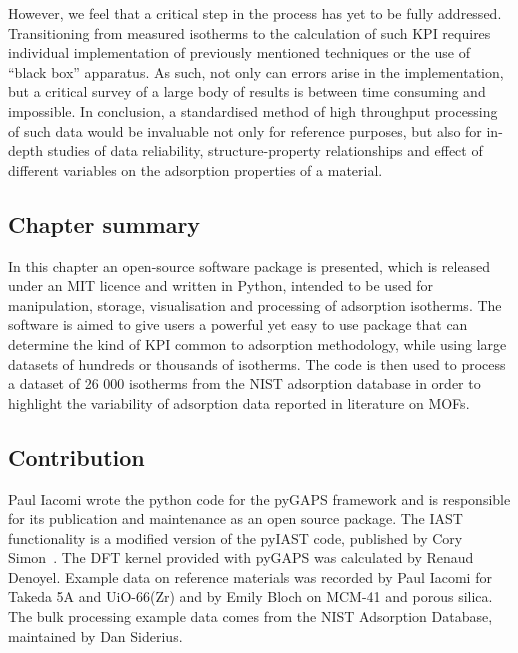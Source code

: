 However, we feel that a critical step in the process has yet
to be fully addressed. Transitioning from measured isotherms
to the calculation of such \gls{KPI} requires individual
implementation of previously mentioned techniques or the use of 
``black box'' apparatus. As such,
not only can errors arise in the implementation, but
a critical survey of a large body of results is between time consuming
and impossible. In conclusion, a standardised method of high throughput
processing of such data would be invaluable not only for reference purposes,
but also for in-depth studies of data reliability,
structure-property relationships and effect of different variables on
the adsorption properties of a material.

\subsection*{Chapter summary}

In this chapter an open-source software package is presented, which
is released under an MIT licence and written in Python, intended to be
used for manipulation, storage, visualisation and processing of
adsorption isotherms. The software is aimed to give users a powerful
yet easy to use package that can determine the kind of \gls{KPI}
common to adsorption methodology, while using large datasets of hundreds
or thousands of isotherms. The code is then used to process a
dataset of 26 000 isotherms from the \gls{NIST} adsorption database in order
to highlight the variability of adsorption data reported in literature
on \glspl{MOF}.

\subsection*{Contribution}

Paul Iacomi wrote the python code for the pyGAPS framework and is
responsible for its publication and maintenance as an open source
package. The \gls{IAST} functionality is a modified version of
the pyIAST code, published by Cory 
Simon~\cite{simonPyIASTIdealAdsorbed2016}. The DFT kernel 
provided with pyGAPS was calculated by Renaud Denoyel. 
Example data on reference materials was recorded by Paul Iacomi 
for Takeda 5A and UiO-66(Zr) and by Emily Bloch on MCM-41 and
porous silica. The bulk processing
example data comes from the \gls{NIST} Adsorption Database, 
maintained by Dan Siderius.

